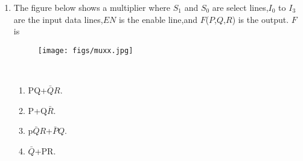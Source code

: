 \documentclass{article}
\begin{document}
\begin{enumerate}
 
    \item The figure below shows a multiplier where $S_1$ and $S_0$ are select lines,$I_0$ to $I_3$ are the input data lines,$EN$ is the enable line,and $F$($P$,$Q$,$R$) is the output. $F$ is \\
    \begin{figure}[h]
             \centering
	     \texttt{[image: figs/muxx.jpg]}

	     \caption{}
	     \label{}
     \end{figure} \\
		\begin{enumerate}[label=(\Alph*)]
			\item PQ+$\bar{Q}R$.
			\item P+Q$\bar{R}$.
		        \item p$\bar{Q}R$+$\bar{P}Q$.
			\item $\bar{Q}$+PR.
		\end{enumerate}
\end{enumerate}
\end{document}
